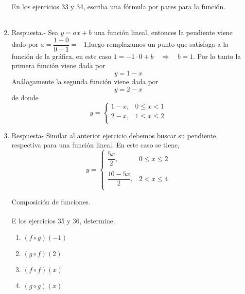 \begin{enumerate}
En los ejercicios 33 y 34, escriba una fórmula por pares para la función.\\\\

\item Respuesta.-\; Sea $y=ax+b$ una función lineal, entonces la pendiente viene dado por $a = \dfrac{1-0}{0-1}=-1$,luego remplazamos un punto que satisfaga a la función de la gráfica, en este caso $1=-1\cdot 0 + b \quad \Longrightarrow \quad b = 1$. Por lo tanto la primera función viene dada por $$y = 1-x$$
    Análogamente la segunda función viene dada por $$y = 2-x$$
    de donde 
    $$y=\left\{\begin{array}{lr}
	1-x,&0\leq x < 1\\
	2-x,&1\leq x \leq 2\\
    \end{array}\right.$$
    \vspace{.5cm}

\item Respuesta-\; Similar al anterior ejercicio debemos buscar su pendiente respectiva para una función lineal. En este caso se tiene,
    $$y = \left\{\begin{array}{lr}
	\dfrac{5x}{2},&0\leq x \leq 2\\\\
	\dfrac{10-5x}{2},&2<x\leq 4\\
    \end{array}\right.$$
    \vspace{.5cm}

Composición de funciones.\\\\
E los ejercicios 35 y 36, determine.
\begin{multicols}{2}
\begin{enumerate}[\bfseries a)]

    \item $(f\circ g)(-1)$\\

    \item $(g\circ f)(2)$\\

    \item $(f\circ f)(x)$\\

    \item $(g\circ g)(x)$\\


\end{enumerate}
\end{multicols}
\end{enumerate}
